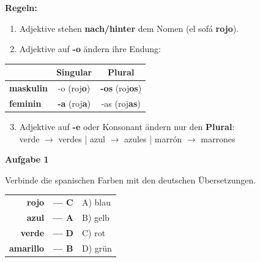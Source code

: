 \documentclass[11pt, a4paper]{article}
\newcommand{\fachfarbe}{spanisch}
\newcommand{\punktebox}[1]{\hfill\fbox{\small \_/#1}}
\newcommand{\loesung}[1]{\textcolor{loesung}{\textbf{#1}}}
\newenvironment{aufgabe}[1]{%
    \needspace{5\baselineskip}%
    \nopagebreak[4]%
    \vspace{10pt}
    \noindent\textbf{\textcolor{\fachfarbe}{Aufgabe #1}}
    \nopagebreak[4]%
    \vspace{5pt}
    \nopagebreak[4]%
    \begin{list}{}{\leftmargin=0pt}
    \item[]
}{%
    \end{list}
}
\newcommand{\es}[1]{\textcolor{\fachfarbe}{\textbf{#1}}}
\begin{document}
\begin{merkkasten}
\textbf{Regeln:}

\vspace{0.5em}

\begin{enumerate}
    \item Adjektive stehen \loesung{nach/hinter} dem Nomen (el sofá \textbf{rojo}).
    \item Adjektive auf \textbf{-o} ändern ihre Endung:
\end{enumerate}

\vspace{0.5em}

\begin{center}
\begin{tabular}{|l|c|c|}
\hline
& \textbf{Singular} & \textbf{Plural} \\
\hline
\textbf{maskulin} & -o (roj\textbf{o}) & \loesung{-os} (roj\textbf{os}) \\
\hline
\textbf{feminin} & \loesung{-a} (roj\textbf{a}) & -as (roj\textbf{as}) \\
\hline
\end{tabular}
\end{center}

\vspace{0.5em}

\begin{enumerate}
    \setcounter{enumi}{2}
    \item Adjektive auf \textbf{-e} oder Konsonant ändern nur den \loesung{Plural}:\\
    verde $\rightarrow$ verdes | azul $\rightarrow$ azules | marrón $\rightarrow$ marrones
\end{enumerate}

\end{merkkasten}

\vspace{15pt}


\begin{aufgabe}{1}
Verbinde die spanischen Farben mit den deutschen Übersetzungen. \punktebox{4}
\end{aufgabe}

\begin{center}
\begin{tabular}{rcl}
\es{rojo} & \loesung{--- C} & A) blau \\[0.8em]
\es{azul} & \loesung{--- A} & B) gelb \\[0.8em]
\es{verde} & \loesung{--- D} & C) rot \\[0.8em]
\es{amarillo} & \loesung{--- B} & D) grün \\
\end{tabular}
\end{center}
\end{document}
